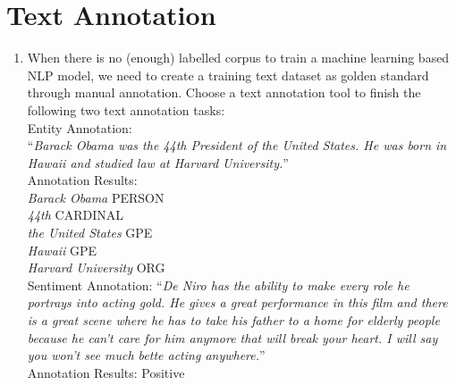 \documentclass[conference]{IEEEtran}
\begin{document}
\section{Text Annotation}
\begin{enumerate}
\item When there is no (enough) labelled corpus to train a machine learning based NLP model, we need to create a training text dataset as golden standard through manual annotation. Choose a text annotation tool to finish the following two text annotation tasks:\\

\noindent Entity Annotation:\\ “\textit{Barack Obama was the 44th President of the United States. He was born in Hawaii and studied law at Harvard University.}”\\

Annotation Results: \\
\textit{Barack Obama} PERSON\\
\textit{44th} CARDINAL\\
\textit{the United States} GPE\\
\textit{Hawaii} GPE\\
\textit{Harvard University} ORG\\

Sentiment Annotation: “\textit{De Niro has the ability to make every role he portrays into acting gold. He gives a great performance in this film and there is a great scene where he has to take his father to a home for elderly people because he can't care for him anymore that will break your heart. I will say you won't see much bette acting anywhere.}”\\
Annotation Results: Positive\\


\end{enumerate}
\end{document}
